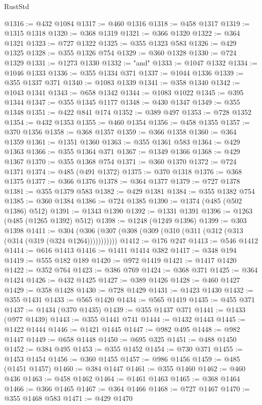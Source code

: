 \begin{lexlean}{RustStd}
\begin{coremodule}
@1316 := @432 @1084
@1317 := @460 @1316
@1318 := @458 @1317
@1319 := @1315 @1318
@1320 := @368 @1319
@1321 := @366 @1320
@1322 := @364 @1321
@1323 := @727 @1322
@1325 := @355 @1323 @583
@1326 := @429 @1325
@1328 := @355 @1326 @754
@1329 := @360 @1328
@1330 := @724 @1329
@1331 := @1273 @1330
@1332 := "and"
@1333 := @1047 @1332
@1334 := @1046 @1333
@1336 := @355 @1334 @371
@1337 := @1044 @1336
@1339 := @355 @1337 @371
@1340 := @1083 @1339
@1341 := @358 @1340
@1342 := @1043 @1341
@1343 := @658 @1342
@1344 := @1083 @1022
@1345 := @395 @1344
@1347 := @355 @1345 @1177
@1348 := @430 @1347
@1349 := @355 @1348
@1351 := @422 @841 @174
@1352 := @389 @497
@1353 := @728 @1352
@1354 := @432 @1353
@1355 := @460 @1354
@1356 := @458 @1355
@1357 := @370 @1356
@1358 := @368 @1357
@1359 := @366 @1358
@1360 := @364 @1359
@1361 := @1351 @1360
@1363 := @355 @1361 @583
@1364 := @429 @1363
@1366 := @355 @1364 @371
@1367 := @1349 @1366
@1368 := @429 @1367
@1370 := @355 @1368 @754
@1371 := @360 @1370
@1372 := @724 @1371
@1374 := @485 (@491 @1372)
@1375 := @370 @1318
@1376 := @368 @1375
@1377 := @366 @1376
@1378 := @364 @1377
@1379 := @727 @1378
@1381 := @355 @1379 @583
@1382 := @429 @1381
@1384 := @355 @1382 @754
@1385 := @360 @1384
@1386 := @724 @1385
@1390 := @1374 (@485 (@502 @1386) @512)
@1391 := @1343 @1390
@1392 := @1331 @1391
@1396 := @1263 (@485 (@1265 @1392) @512)
@1398 := @1248 (@1249 @1396)
@1399 := @303 @1398
@1411 := @304 (@306 (@307 (@308 (@309 (@310 (@311 (@312 (@313 (@314 (@319 (@324 @1264)))))))))))
@1412 := @176 @247
@1413 := @546 @1412
@1414 := @616 @1413
@1416 := @1411 @1414 @382
@1417 := @348 @194
@1419 := @555 @182 @189
@1420 := @972 @1419
@1421 := @1417 @1420
@1422 := @352 @764
@1423 := @386 @769
@1424 := @368 @371
@1425 := @364 @1424
@1426 := @432 @1425
@1427 := @389 @1426
@1428 := @460 @1427
@1429 := @358 @1428
@1430 := @728 @1429
@1431 := @1423 @1430
@1432 := @355 @1431
@1433 := @565 @1420
@1434 := @565 @1419
@1435 := @455 @371
@1437 := @1434 (@370 @1435)
@1439 := @355 @1437 @371
@1441 := @1433 (@977 @1439)
@1443 := @355 @1441 @741
@1444 := @1432 @1443
@1445 := @1422 @1444
@1446 := @1421 @1445
@1447 := @982 @495
@1448 := @982 @1447
@1449 := @658 @1448
@1450 := @695 @325
@1451 := @488 @1450
@1452 := @384 @495
@1453 := @355 @1452
@1454 := @730 @371
@1455 := @1453 @1454
@1456 := @360 @1455
@1457 := @986 @1456
@1459 := @485 (@1451 @1457)
@1460 := @384 @1447
@1461 := @355 @1460
@1462 := @460 @436
@1463 := @458 @1462
@1464 := @1461 @1463
@1465 := @368 @1464
@1466 := @366 @1465
@1467 := @364 @1466
@1468 := @727 @1467
@1470 := @355 @1468 @583
@1471 := @429 @1470

\end{coremodule}
\end{lexlean}
